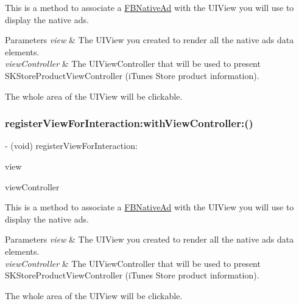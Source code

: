 This is a method to associate a \hyperlink{interfaceFBNativeAd}{F\+B\+Native\+Ad} with the U\+I\+View you will use to display the native ads.


\begin{DoxyParams}{Parameters}
{\em view} & The U\+I\+View you created to render all the native ads data elements. \\
\hline
{\em view\+Controller} & The U\+I\+View\+Controller that will be used to present S\+K\+Store\+Product\+View\+Controller (i\+Tunes Store product information).\\
\hline
\end{DoxyParams}
The whole area of the U\+I\+View will be clickable. \mbox{\label{interfaceFBNativeAd_af14f3514ad32a7b1b73ee6e94c1bba16}} 
\subsubsection{\texorpdfstring{register\+View\+For\+Interaction\+:with\+View\+Controller\+:()}{registerViewForInteraction:withViewController:()}\hspace{0.1cm}{\footnotesize\ttfamily [2/5]}}
{\footnotesize\ttfamily -\/ (void) register\+View\+For\+Interaction\+: \begin{DoxyParamCaption}\item[{(U\+I\+View $\ast$)}]{view }\item[{withViewController:(U\+I\+View\+Controller $\ast$)}]{view\+Controller }\end{DoxyParamCaption}}

This is a method to associate a \hyperlink{interfaceFBNativeAd}{F\+B\+Native\+Ad} with the U\+I\+View you will use to display the native ads.


\begin{DoxyParams}{Parameters}
{\em view} & The U\+I\+View you created to render all the native ads data elements. \\
\hline
{\em view\+Controller} & The U\+I\+View\+Controller that will be used to present S\+K\+Store\+Product\+View\+Controller (i\+Tunes Store product information).\\
\hline
\end{DoxyParams}
The whole area of the U\+I\+View will be clickable. \mbox{\label{interfaceFBNativeAd_af14f3514ad32a7b1b73ee6e94c1bba16}} 
